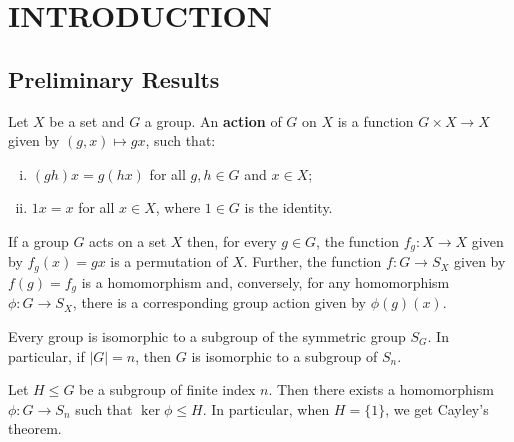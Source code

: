 \chapter{INTRODUCTION}

\section{Preliminary Results}

\begin{definition} \cite[99]{Rotman1967} \cite[41]{DummitFoote2004} Let $X$ be a set and $G$ a group. An \textbf{action} of $G$ on $X$ is a function $G \times X \to X$ given by $(g, x) \mapsto gx$, such that:
\begin{enumerate}[i.]
\item $(gh)x = g(hx)$ for all $g, h \in G$ and $x \in X$;
\item $1x = x$ for all $x \in X$, where $1 \in G$ is the identity.
\end{enumerate}
\end{definition}

\begin{proposition} \cite[99]{Rotman1967} \cite[42]{DummitFoote2004} If a group $G$ acts on a set $X$ then, for every $g \in G$, the function $f_g : X \to X$ given by $f_g(x) = gx$ is a permutation of $X$. Further, the function $f : G \to S_X$ given by $f(g) = f_g$ is a homomorphism and, conversely, for any homomorphism $\phi : G \to S_X$, there is a corresponding group action given by $\phi(g)(x)$.
\end{proposition}

\begin{theorem}[Cayley] \cite[96]{Rotman1967} \cite[120]{DummitFoote2004} Every group is isomorphic to a subgroup of the symmetric group $S_G$. In particular, if $|G| = n$, then $G$ is isomorphic to a subgroup of $S_n$.
\end{theorem}

\begin{theorem} \cite[97]{Rotman1967} Let $H \leq G$ be a subgroup of finite index $n$. Then there exists a homomorphism $\phi : G \to S_n$ such that $\ker \phi \leq H$. In particular, when $H = \{ 1 \}$, we get Cayley's theorem.
\end{theorem}

